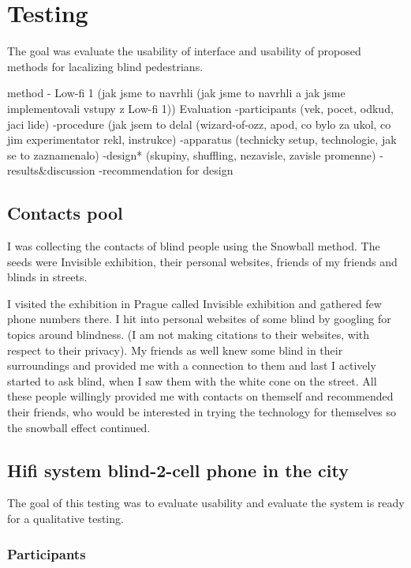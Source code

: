	\chapter{Testing}	
		
	The goal was evaluate the usability of interface and usability of proposed methods for lacalizing blind pedestrians. 
	
	method - Low-fi 1
	(jak jsme to navrhli (jak jsme to navrhli a jak jsme implementovali vstupy z Low-fi 1))
	Evaluation
	-participants (vek, pocet, odkud, jaci lide)
	-procedure (jak jsem to delal (wizard-of-ozz, apod, co bylo za ukol, co jim experimentator rekl, instrukce)
	-apparatus (technicky setup, technologie, jak se to zaznamenalo)
	-design* (skupiny, shuffling, nezavisle, zavisle promenne)
	-results\&discussion
	-recommendation for design
	
	\section{Contacts pool} \label{sec:contactsPool}
	I was collecting the contacts of blind people using the Snowball method. The seeds were Invisible exhibition, their personal websites, friends of my friends and blinds in streets.
	
	I visited the exhibition in Prague called Invisible exhibition \cite{later} and gathered few phone numbers there. I hit into personal websites of some blind by googling for topics around blindness. (I am not making citations to their websites, with respect to their privacy). My friends as well knew some blind in their surroundings and provided me with a connection to them and last I actively started to ask blind, when I saw them with the white cone on the street. All these people willingly provided me with contacts on themself and recommended their friends, who would be interested in trying the technology for themselves so the snowball effect continued.
	
	\section{Hifi system blind-2-cell phone in the city}
	The goal of this testing was to evaluate usability and evaluate the system is ready for a qualitative testing.
	
	\subsection{Participants}
	
